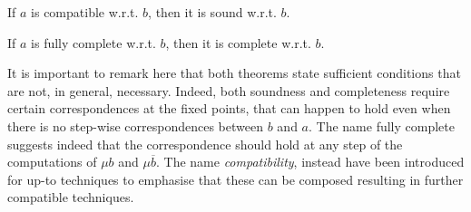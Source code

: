 \documentclass{llncs}
\begin{document}
%
%
\begin{theorem}\label{prop:compatible}
If $a$ is compatible w.r.t. $b$, then it is sound w.r.t. $b$.
\end{theorem}
%
\begin{theorem}\label{prop:Cousot} 
If $a$ is fully complete w.r.t. $b$, then it is complete w.r.t. $b$. 
\end{theorem}
%
It is important to remark here that both theorems state sufficient conditions that are not, in general, necessary. Indeed, both soundness and completeness require certain correspondences at the fixed points, that can happen to hold even when there is no step-wise correspondences between $b$ and $a$. The name fully complete suggests indeed that the correspondence should hold at any step of the computations of $\mu b$ and $\mu \overline{b}$. The name \emph{compatibility}, instead have been introduced for up-to techniques to emphasise that these can be composed resulting in further compatible techniques.

\end{document}

